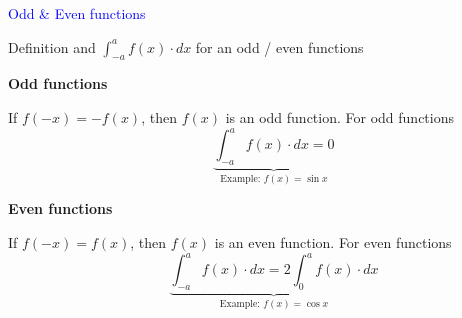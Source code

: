 \documentclass[14pt,fleqn]{extarticle}
\begin{document}
\begin{skill}
\textcolor{blue}{Odd \& Even functions} 

Definition and $\int_{-a}^a f(x)\cdot dx$ for an odd / even functions
\end{skill} 

\newcard 

\textbf{Odd functions} 

If $f(-x) = -f(x)$, then $f(x)$ is an odd function.
For odd functions
\[ \qquad \underbrace{\int_{-a}^a f(x)\cdot dx = 0}_{\text{Example: }f(x) = \sin x} \]

\textbf{Even functions} 

If $f(-x) = f(x)$, then $f(x)$ is an even function. For even functions
\[ \qquad \underbrace{\int_{-a}^a f(x)\cdot dx = 2\int_0^a f(x)\cdot dx}_{\text{Example: }f(x) = \cos x}\]
\end{document}

